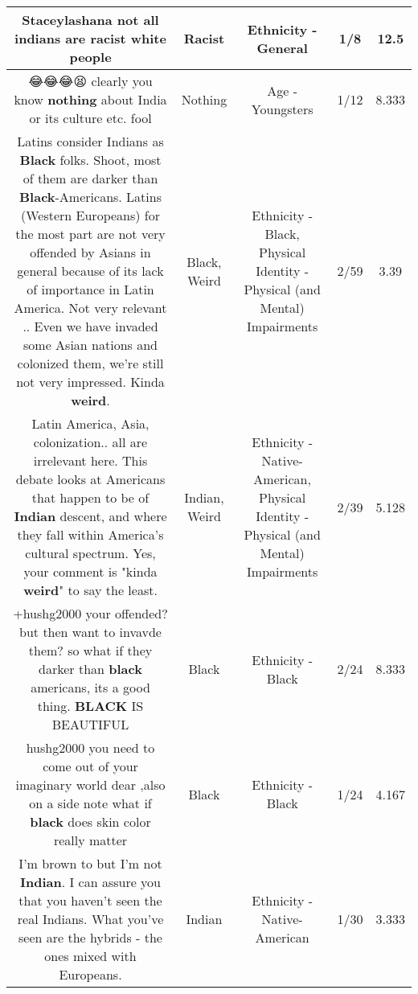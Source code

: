 \documentclass[11pt]{article}
\newlength\mylength
\begin{document}
\begin{center}
\begin{longtable}{|C{.65\mylength}|C{.30\mylength}|C{.12\mylength}|C{.12\mylength}|C{.12\mylength}|}
  \small Staceylashana not all indians are \textbf{racist} white people\normalsize   & Racist & Ethnicity - General & 1/8 & 12.5 \\  \hline
  \small 😂😂😂😫 clearly you know \textbf{nothing} about India or its culture etc. fool\normalsize   & Nothing & Age - Youngsters & 1/12 & 8.333 \\  \hline
  \small Latins consider Indians as \textbf{Black} folks. Shoot, most of them are darker than \textbf{Black}-Americans. Latins (Western Europeans) for the most part are not very offended by Asians in general because of its lack of importance in Latin America. Not very relevant .. Even we have invaded some Asian nations and colonized them, we're still not very impressed. Kinda \textbf{weird}.\normalsize   & Black, Weird & Ethnicity - Black, Physical Identity - Physical (and Mental) Impairments & 2/59 & 3.39 \\  \hline
  \small {} Latin America, Asia, colonization.. all are irrelevant here. This debate looks at Americans that happen to be of \textbf{Indian} descent, and where they fall within America's cultural spectrum. Yes, your comment is "kinda \textbf{weird}" to say the least.\normalsize   & Indian, Weird & Ethnicity - Native-American, Physical Identity - Physical (and Mental) Impairments & 2/39 & 5.128 \\  \hline
  \small +hushg2000 your offended? but then want to invavde them? so what if they darker than \textbf{black} americans, its a good thing. \textbf{BLACK} IS BEAUTIFUL\normalsize   & Black & Ethnicity - Black & 2/24 & 8.333 \\  \hline
  \small hushg2000 you need to come out of your imaginary world dear ,also on a side note what if \textbf{black} does skin color really matter\normalsize   & Black & Ethnicity - Black & 1/24 & 4.167 \\  \hline
  \small I'm brown to but I'm not \textbf{Indian}. I can assure you that you haven't seen the real Indians. What you've seen are the hybrids - the ones mixed with Europeans.\normalsize   & Indian & Ethnicity - Native-American & 1/30 & 3.333 \\  \hline

\end{longtable}
\end{center}
\end{document}
